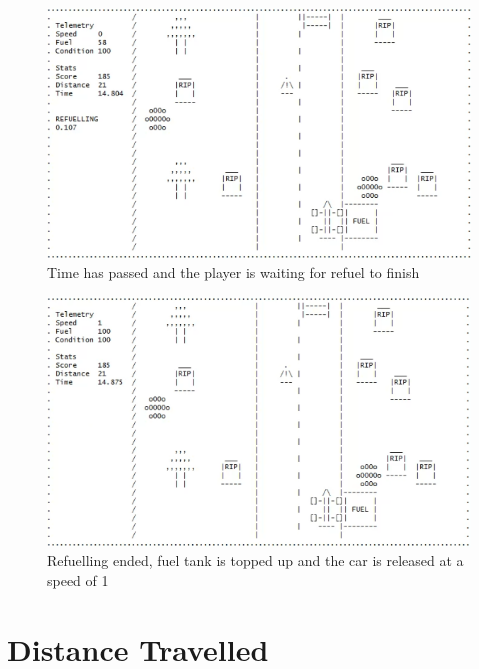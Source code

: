 \documentclass{article}
\begin{document}
\begin{figure}[!ht]
	\begin{center}
	\includegraphics[width=0.63\paperwidth]{images/fuel_test_refuelend}
	\caption{Time has passed and the player is waiting for refuel to finish}
	\label{fig:fuel_test_refuelend} 
	\end{center}
\end{figure}
\begin{figure}[!ht]
	\begin{center}
	\includegraphics[width=0.63\paperwidth]{images/fuel_test_refuelrelease}
	\caption{Refuelling ended, fuel tank is topped up and the car is released at a speed of 1}
	\label{fig:fuel_test_refuelrelease} 
	\end{center}
\end{figure}
\clearpage


\section{Distance Travelled}
\end{document}
